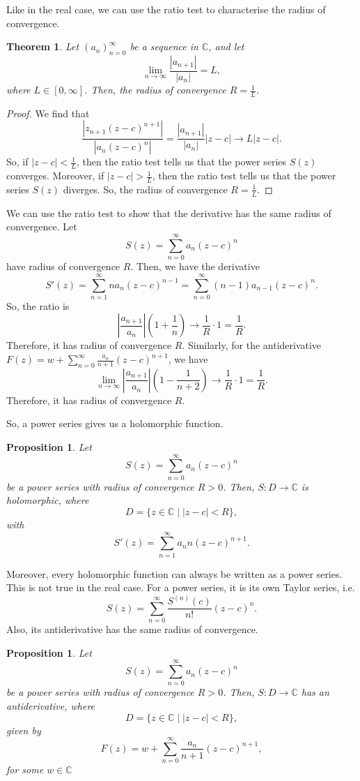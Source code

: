 \documentclass[a4paper, openany]{memoir}
\theoremstyle{definition}
\theoremstyle{plain}
\newtheorem{theorem}[definition]{Theorem}
\newtheorem{proposition}[definition]{Proposition}
\begin{document}
Like in the real case, we can use the ratio test to characterise the radius of convergence.
\begin{theorem}
Let $(a_n)_{n=0}^{\infty}$ be a sequence in $\mathbb{C}$, and let
\[\lim_{n \to \infty} \frac{|a_{n+1}|}{|a_n|} = L,\]
where $L \in [0, \infty]$. Then, the radius of convergence $R = \frac{1}{L}$.
\end{theorem}
\begin{proof}
We find that
\[\frac{|z_{n+1}(z - c)^{n+1}|}{|a_n (z - c)^n|} = \frac{|a_{n+1}|}{|a_n|} |z - c| \to L|z - c|.\]
So, if $|z - c| < \frac{1}{L}$, then the ratio test tells us that the power series $S(z)$ converges. Moreover, if $|z - c| > \frac{1}{L}$, then the ratio test tells us that the power series $S(z)$ diverges. So, the radius of convergence $R = \frac{1}{L}$.
\end{proof}

We can use the ratio test to show that the derivative has the same radius of convergence. Let
\[S(z) = \sum_{n=0}^{\infty} a_n (z - c)^n\]
have radius of convergence $R$. Then, we have the derivative
\[S'(z) = \sum_{n=1}^{\infty} na_n (z - c)^{n-1} = \sum_{n=0}^{\infty} (n-1) a_{n-1} (z - c)^n.\]
So, the ratio is
\[\left|\frac{a_{n+1}}{a_n}\right| \left(1 + \frac{1}{n}\right) \to \frac{1}{R} \cdot 1 = \frac{1}{R}.\]
Therefore, it has radius of convergence $R$. Similarly, for the antiderivative $F(z) = w + \sum_{n=0}^{\infty} \frac{a_n}{n+1} (z - c)^{n+1}$, we have
\[\lim_{n \to \infty} \left|\frac{a_{n+1}}{a_n}\right| \left(1 - \frac{1}{n+2}\right) \to \frac{1}{R} \cdot 1 = \frac{1}{R}.\]
Therefore, it has radius of convergence $R$.

So, a power series gives us a holomorphic function.
\begin{proposition}
Let 
\[S(z) = \sum_{n=0}^{\infty} a_n (z - c)^n\]
be a power series with radius of convergence $R > 0$. Then, $S: D \to \mathbb{C}$ is holomorphic, where
\[D = \{z \in \mathbb{C} \mid |z - c| < R\},\]
with 
\[S'(z) = \sum_{n=1}^{\infty} a_n n (z - c)^{n+1}.\]
\end{proposition}

\noindent Moreover, every holomorphic function can always be written as a power series. This is not true in the real case. For a power series, it is its own Taylor series, i.e.
\[S(z) = \sum_{n=0}^{\infty} \frac{S^{(n)}(c)}{n!} (z - c)^n.\]
Also, its antiderivative has the same radius of convergence.
\begin{proposition}
Let 
\[S(z) = \sum_{n=0}^{\infty} a_n (z - c)^n\]
be a power series with radius of convergence $R > 0$. Then, $S: D \to \mathbb{C}$ has an antiderivative, where
\[D = \{z \in \mathbb{C} \mid |z - c| < R\},\]
given by
\[F(z) = w + \sum_{n=0}^{\infty} \frac{a_n}{n+1} (z - c)^{n+1},\]
for some $w \in \mathbb{C}$
\end{proposition}
\end{document}
